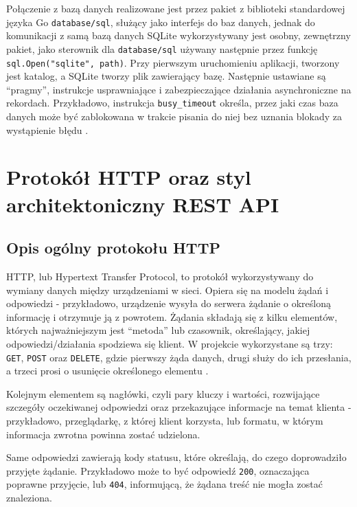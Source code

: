 Połączenie z bazą danych realizowane jest przez pakiet z biblioteki standardowej języka Go \texttt{database/sql}, służący jako interfejs do baz danych, jednak do komunikacji z samą bazą danych SQLite wykorzystywany jest osobny, zewnętrzny pakiet, jako sterownik dla \texttt{database/sql} używany następnie przez funkcję \texttt{sql.Open("sqlite", path)}. Przy pierwszym uruchomieniu aplikacji, tworzony jest katalog, a SQLite tworzy plik zawierający bazę. Następnie ustawiane są \enquote{pragmy}, instrukcje usprawniające i zabezpieczające działania asynchroniczne na rekordach. Przykładowo, instrukcja \texttt{busy\_timeout} określa, przez jaki czas baza danych może być zablokowana w trakcie pisania do niej bez uznania blokady za wystąpienie błędu \parencite{sqlite_pragma}. 

\section{Protokół HTTP oraz styl architektoniczny REST API}
\subsection{Opis ogólny protokołu HTTP}
HTTP, lub Hypertext Transfer Protocol, to protokół wykorzystywany do wymiany danych między urządzeniami w sieci. Opiera się na modelu żądań i odpowiedzi - przykładowo, urządzenie wysyła do serwera żądanie o określoną informację i otrzymuje ją z powrotem. Żądania składają się z kilku elementów, których najważniejszym jest \enquote{metoda} lub czasownik, określający, jakiej odpowiedzi/działania spodziewa się klient. W projekcie wykorzystane są trzy: \texttt{GET}, \texttt{POST} oraz \texttt{DELETE}, gdzie pierwszy żąda danych, drugi służy do ich przesłania, a trzeci prosi o usunięcie określonego elementu \parencite{rfc9110}.

Kolejnym elementem są nagłówki, czyli pary kluczy i wartości, rozwijające szczegóły oczekiwanej odpowiedzi oraz przekazujące informacje na temat klienta - przykładowo, przeglądarkę, z której klient korzysta, lub formatu, w którym informacja zwrotna powinna zostać udzielona. 

Same odpowiedzi zawierają kody statusu, które określają, do czego doprowadziło przyjęte żądanie. Przykładowo może to być odpowiedź \texttt{200}, oznaczająca poprawne przyjęcie, lub \texttt{404}, informującą, że żądana treść nie mogła zostać znaleziona.

